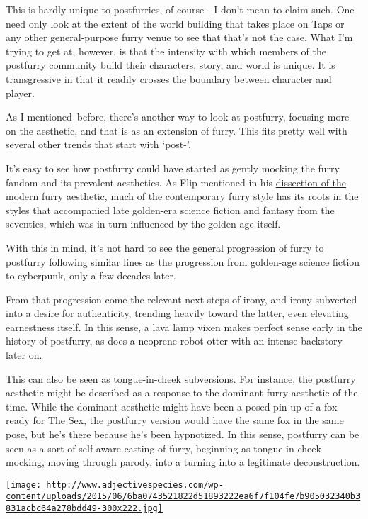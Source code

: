 This is hardly unique to postfurries, of course - I don't mean to claim
such. One need only look at the extent of the world building that takes
place on Taps or any other general-purpose furry venue to see that
that's not the case. What I'm trying to get at, however, is that the
intensity with which members of the postfurry community build their
characters, story, and world is unique. It is transgressive in that it
readily crosses the boundary between character and player.

As I mentioned~before, there's another way to look at postfurry,
focusing more on the aesthetic, and that is as an extension of furry.
This fits pretty well with several other trends that start with `post-'.

It's easy to see how postfurry could have started as gently mocking the
furry fandom and its prevalent aesthetics. As Flip mentioned in his
\href{http://www.adjectivespecies.com/2015/06/08/the-modern-furry-aesthetic-an-interview-with-flip/}{dissection
of the modern furry aesthetic}, much of the contemporary furry style has
its roots in the styles that accompanied late golden-era science fiction
and fantasy from the seventies, which was in turn influenced by the
golden age itself.

With this in mind, it's not hard to see the general progression of furry
to postfurry following similar lines as the progression from golden-age
science fiction to cyberpunk, only a few decades later.

From that progression come the relevant next steps of irony, and irony
subverted into a desire for authenticity, trending heavily toward the
latter, even elevating earnestness itself. In this sense, a lava lamp
vixen makes perfect sense early in the history of postfurry, as does a
neoprene robot otter with an intense backstory later on.

This can also be seen as tongue-in-cheek subversions. For instance, the
postfurry aesthetic might be described as a response to the dominant
furry aesthetic of the time. While the dominant aesthetic might have
been a posed pin-up of a fox ready for The Sex, the postfurry version
would have the same fox in the same pose, but he's there because he's
been hypnotized. In this sense, postfurry can be seen as a sort of
self-aware casting of furry, beginning as tongue-in-cheek mocking,
moving through parody, into a turning into a legitimate deconstruction.

\href{http://www.adjectivespecies.com/wp-content/uploads/2015/06/6ba0743521822d51893222ea6f7f104fe7b905032340b3831acbc64a278bdd49.jpg}{\texttt{[image: http://www.adjectivespecies.com/wp-content/uploads/2015/06/6ba0743521822d51893222ea6f7f104fe7b905032340b3831acbc64a278bdd49-300x222.jpg]}}

